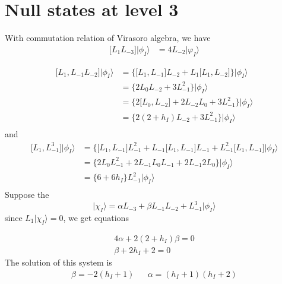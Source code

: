 \section{Null states at level 3}
With commutation relation of Virasoro algebra, we have
\[
\begin{aligned}
\lbrack L_1 L_{-3}\rbrack \big| \phi_I \rangle & = 4 L_{-2} \big| \varphi_I \rangle
\end{aligned}
\]

\[
\begin{aligned}
\lbrack L_1, L_{-1}L_{-2} \rbrack \big| \phi_I \rangle & = \lbrace \lbrack L_1, L_{-1} \rbrack L_{-2} + L_1 \lbrack L_1, L_{-2} \rbrack \rbrace \big| \phi_I \rangle\\
&= \lbrace 2 L_0 L_{-2} + 3 L_{-1}^2 \rbrace \big| \phi_I \rangle \\
& = \lbrace 2\lbrack L_0, L_{-2}\rbrack + 2L_{-2} L_0 + 3 L_{-1}^2 \rbrace \big| \phi_I \rangle\\
& = \lbrace 2(2+ h_I )L_{-2} + 3 L_{-1}^2 \rbrace \big| \phi_I \rangle\\
\end{aligned}
\]
and 
\[
\begin{aligned}
\lbrack L_1 , L^3_{-1} \rbrack \big| \phi_I \rangle &= \lbrace \lbrack L_1, L_{-1} \rbrack L_{-1}^2 + L_{-1} \lbrack L_1, L_{-1} \rbrack L_{-1} + L_{-1}^2 \lbrack L_1, L_{-1} \rbrack \big| \phi_I \rangle\\
&= \lbrace 2 L_0 L_{-1}^2 + 2 L_{-1}L_0 L_{-1} + 2 L_{-1}2 L_0 \rbrace \big| \phi_I \rangle \\
& = \lbrace 6 + 6 h_I \rbrace L_{-1}^2 \big| \phi_I \rangle\\
\end{aligned}
\]
Suppose the 
\[
\big| \chi_I \rangle = \alpha L_{-3} + \beta L_{-1}L_{-2} +  L_{-1}^3 \big| \phi_I \rangle
\]
since $L_1 \big| \chi_I \rangle = 0$, we get equations

\begin{eqnarray}
4 \alpha + 2(2+ h_I) \beta =0\\
\beta + 2h_I +2 =0 
\end{eqnarray}
The solution of this system is 
\[
\begin{aligned}
\beta = -2(h_I +1) & & \alpha = (h_I + 1)(h_I + 2)
\end{aligned}
\]


